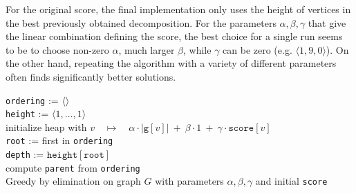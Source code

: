 \documentclass{timgad}
\begin{document}
For the original score, the final implementation only uses the height of vertices in the best previously obtained decomposition.
For the parameters $\alpha,\beta,\gamma$ that give the linear combination defining the score,
the best choice for a single run seems to be to choose non-zero $\alpha$, much larger $\beta$, while $\gamma$ can be zero (e.g. $\langle1,9,0\rangle$).
On the other hand, repeating the algorithm with a variety of different parameters often finds significantly better solutions.

\begin{algorithm}[h]
 \texttt{ordering} := $\langle\rangle$\\
 \texttt{height} := $\langle 1,\dots,1\rangle$\\ 
 initialize heap with $v \quad \mapsto \quad \alpha \cdot |\texttt{g}[v]|\ +\ \beta \cdot 1\ +\ \gamma \cdot \texttt{score}[v]$\\
 \texttt{root} := first in \texttt{ordering}\\ 
 \texttt{depth} := $\texttt{height}[\texttt{root}]$\\
 compute \texttt{parent} from \texttt{ordering}\\ 
 \caption{Greedy by elimination on graph $G$ with parameters $\alpha,\beta,\gamma$ and initial \texttt{score}\hspace*{-2em}}
 \label{alg:elim}
\end{algorithm}

\pagebreak[4] 
\end{document}
